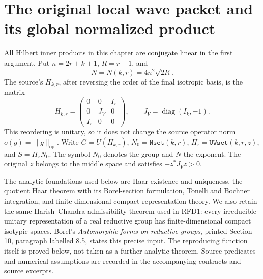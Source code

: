 \section{The original local wave packet and its global normalized product}
\label{sec:bessel-wave-packets-v49}


All Hilbert inner products in this chapter are conjugate linear in the
first argument.  Put \(n=2r+k+1\), \(R=r+1\), and
\[
 N=N(k,r)=4n^2\sqrt{2R}.
 \tag{BWP.1}
\]
The source's \(H_{k,r}\), after reversing the order of the final
isotropic basis, is the matrix
\[
 H_{k,r}=\begin{pmatrix}0&0&I_r\\0&J_V&0\\I_r&0&0\end{pmatrix},
 \qquad J_V=\operatorname{diag}(I_k,-1).
 \tag{BWP.2}
\]
This reordering is unitary, so it does not change the source operator
norm \(o(g)=\|g\|_{\mathrm{op}}\).  Write \(G=U(H_{k,r})\),
\(N_0=\texttt{Nset}(k,r)\), \(H_z=\texttt{UWset}(k,r,z)\),
and \(S=H_zN_0\).  The symbol \(N_0\) denotes the group and
\(N\) the exponent.  The original \(z\) belongs to the middle
space and satisfies \(-z^*J_Vz>0\).

The analytic foundations used below are Haar existence and uniqueness,
the quotient Haar theorem with its Borel-section formulation, Tonelli
and Bochner integration, and finite-dimensional compact representation
theory.  We also retain the same Harish--Chandra admissibility theorem
used in RFD1: every irreducible unitary representation of a real
reductive group has finite-dimensional compact isotypic spaces.
Borel's \emph{Automorphic forms on reductive groups}, printed
Section 10, paragraph labelled 8.5, states this precise input.
The reproducing function itself is proved below, not taken as a further
analytic theorem.  Source predicates and numerical assumptions are
recorded in the accompanying contracts and source excerpts.

